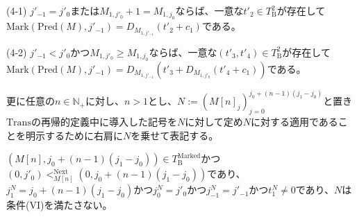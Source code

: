 \documentclass[dvipdfmx,uplatex]{jsarticle}
\theoremstyle{customnonumberbreakfortheorem}
\theoremstyle{customnonumberbreakforproof}
\begin{document}
\begin{lemma}
\begin{penumerate}
		\begin{indented}
			\item[(4-1)] \(j'_{-1} = j'_0\)または\(M_{1,j'_0}+1 = M_{1,j_0}\)ならば、一意な\(t'_2 \in T_{\textrm{B}}^2\)が存在して\(\textrm{Mark}(\textrm{Pred}(M),j'_{-1}) = D_{M_{1,j'_{-1}}}(t'_2+c_1)\)である。
			\item[(4-2)] \(j'_{-1} < j'_0\)かつ\(M_{1,j'_0} \geq M_{1,j_0}\)ならば、一意な\((t'_3,t'_4) \in T_{\textrm{B}}^2\)が存在して\(\textrm{Mark}(\textrm{Pred}(M),j'_{-1}) = D_{M_{1,j'_{-1}}}(t'_3 + D_{M_{1,j'_0}}(t'_4+c_1))\)である。
		\end{indented}
	\end{penumerate}
	更に任意の\(n \in \mathbb{N}_+\)に対し、\(n > 1\)とし、\(N := (M[n]_j)_{j=0}^{j_0+(n-1)(j_1-j_0)}\)と置き\(\textrm{Trans}\)の再帰的定義中に導入した記号を\(N\)に対して定め\(N\)に対する適用であることを明示するために右肩に\(N\)を乗せて表記する。
	\begin{penumerate}
		\setcounter{penumeratei}{4}
		\item \((M[n],j_0+(n-1)(j_1-j_0)) \in T_{\textrm{B}}^{\textrm{Marked}}\)かつ\((0,j'_0) <_{M[n]}^{\textrm{Next}} (0,j_0+(n-1)(j_1-j_0))\)であり、\(j_1^N = j_0+(n-1)(j_1-j_0)\)かつ\(j_0^N = j'_0\)かつ\(j_{-1}^N = j'_{-1}\)かつ\(t_1^N \neq 0\)であり、\(N\)は条件(VI)を満たさない。
	\end{penumerate}
\end{lemma}
\end{document}
